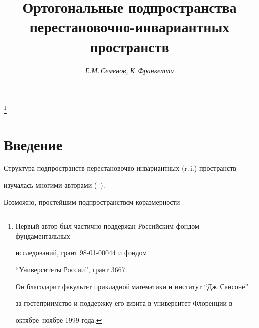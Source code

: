 






\author{\it Е.М.\,Семенов, К.\,Франкетти}




\title{Ортогональные подпространства перестановочно-инвариантных пространств}


\thanks{Первый автор был частично поддержан Российским фондом фундаментальных


исследований, грант 98-01-00044 и фондом 


``Университеты России'', грант 3667. 


Он благодарит факультет прикладной математики и институт ``Дж.\,Сансоне''


за гостеприимство и поддержку его визита в университет Флоренции в 


октябре--ноябре 1999 года. }





\date{}




\pagestyle{plain} %







\maketitle


\label{begin}











\section*{Введение}





Структура подпространств перестановочно-инвариантных (r.\,i.) пространств


изучалась многими авторами (\cite{LT}--\cite{BS}). 


Возможно, простейшим подпространством коразмерности


